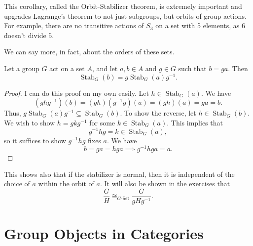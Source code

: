 This corollary, called the Orbit-Stabilizer theorem, is extremely important and upgrades Lagrange's theorem to not just subgroups, but orbits of group actions. For example, there are no transitive actions of $S_3$ on a set with 5 elements, as $6$ doesn't divide $5$.

We can say more, in fact, about the orders of these sets.
\begin{proposition}\label{prp:2.9.2}
	Let a group $G$ act on a set $A$, and let $a,b\in A$ and $g\in G$ such that $b=ga$. Then
	\[
		\operatorname{Stab}_G(b) =g \operatorname{Stab}_G(a) g^{-1}
	.\]
\end{proposition}
\begin{proof}
	I can do this proof on my own easily. Let $h\in \operatorname{Stab}_G(a) $. We have
	\[
		(ghg^{-1})(b)=(gh)(g^{-1}g)(a)=(gh)(a)=ga=b
	.\]
	Thus, $g \operatorname{Stab}_G(a) g^{-1}\subseteq \operatorname{Stab}_G(b) $. To show the reverse, let $h\in \operatorname{Stab}_G(b) $. We wish to show $h=gkg^{-1}$ for some $k\in \operatorname{Stab}_G(a) $. This implies that
	\[
		g^{-1}hg = k\in \operatorname{Stab}_G(a) 
	,\]
	so it suffices to show $g^{-1}hg$ fixes $a$. We have
	\[
		b = ga = hga \implies g^{-1}hga = a
	.\]
\end{proof}
This shows also that if the stabilizer is normal, then it is independent of the choice of $a$ within the orbit of $a$. It will also be shown in the exercises that
\[
	\frac{G}{H}\cong_{G\text{-}\mathsf{Set}}\frac{G}{gHg^{-1}}
.\]

\section{Group Objects in Categories}
